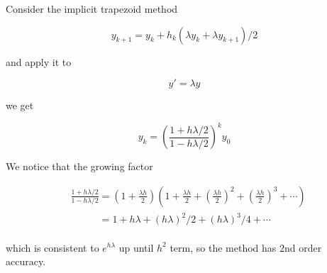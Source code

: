 \documentclass[11pt]{article}
\begin{document}
	Consider the implicit trapezoid method
	
	\[y_{k + 1} = y_k + h_k(\lambda y_k + \lambda y_{k + 1}) / 2\]
	
	and apply it to
	
	\[y' = \lambda y\]
	
	we get
	
	\[y_k = \left(\frac{1 + h\lambda/2}{1 - h\lambda / 2} \right)^k y_0\]
	
	We notice that the growing factor
	
	\begin{align}
		&\frac{1 + h\lambda/2}{1 - h\lambda / 2} = \left(1 + \frac{\lambda h}{2}\right)\left(1 + \frac{\lambda h}{2} + \left(\frac{\lambda h}{2}\right)^2 + \left(\frac{\lambda h}{2}\right)^3 + \cdots\right)\nonumber\\
		&\phantom{\frac{1 + h\lambda/2}{1 - h\lambda / 2}} = 1 + h\lambda + (h\lambda)^2 / 2 + (h\lambda)^3 / 4 + \cdots\nonumber
	\end{align}
	
	which is consistent to $e^{h\lambda}$ up until $h^2$ term, so the method has $2$nd order accuracy.
\end{document}
